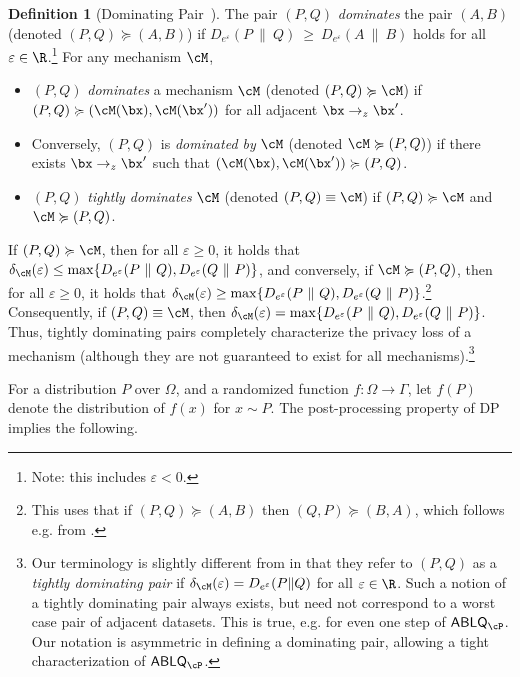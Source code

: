 \documentclass[twoside]{article}
\theoremstyle{definition}
\newtheorem{definition}[theorem]{Definition}
\newcommand{\eps}{\varepsilon}
\newcommand{\Deps}{D_{e^{\eps}}}
\newcommand{\ABLQ}{\mathsf{ABLQ}}
\newcommand{\ABLQP}{\ABLQ_{\cP}}
\newcommand{\dominates}{\succcurlyeq}%
\begin{document}
\begin{definition}[Dominating Pair~\citep{zhu22optimal}]\label{def:dominating-pair}
The pair $(P, Q)$ {\em dominates} the pair $(A, B)$ (denoted $(P, Q) \dominates (A, B)$) if $\Deps(P ~\|~ Q) ~\ge~ \Deps(A ~\|~ B)$ holds for all $\eps \in \R$.\footnote{Note: this includes $\eps < 0$.} For any mechanism $\cM$,
\begin{itemize}
\item $(P, Q)$ {\em dominates} a mechanism $\cM$ (denoted $(P, Q) \dominates \cM$) if $(P, Q) \dominates (\cM(\bx), \cM(\bx'))$ for all adjacent $\bx \to_z \bx'$.
\item Conversely, $(P, Q)$ is {\em dominated by} $\cM$ (denoted $\cM \dominates (P, Q)$) if there exists $\bx \to_z \bx'$ such that $(\cM(\bx), \cM(\bx')) \dominates (P, Q)$.
\item $(P, Q)$ {\em tightly dominates} $\cM$ (denoted $(P, Q) \equiv \cM$) if $(P, Q) \dominates \cM$ and $\cM \dominates (P, Q)$.
\end{itemize}
\end{definition}

If $(P, Q) \dominates \cM$, then for all $\eps \ge 0$, it holds that $\delta_{\cM}(\eps) \le \max \{ D_{e^\eps}(P ~\|~ Q), \Deps(Q ~\|~ P) \}$,
and conversely, if $\cM \dominates (P, Q)$, then for all $\eps \ge 0$, it holds that $\delta_{\cM}(\eps) \ge \max \{ D_{e^\eps}(P ~\|~ Q), \Deps(Q ~\|~ P) \}$.\footnote{This uses that if $(P, Q) \dominates (A, B)$ then $(Q, P) \dominates (B, A)$, which follows e.g. from \citet[Lemma 46]{zhu22optimal}.}
Consequently, if $(P, Q) \equiv \cM$, then $\delta_{\cM}(\eps) = \max\{ D_{e^\eps}(P ~\|~ Q), \Deps(Q ~\|~ P) \}$.
Thus, tightly dominating pairs completely characterize the privacy loss of a mechanism (although they are not guaranteed to exist for all mechanisms).\footnote{Our terminology is slightly different from \cite{zhu22optimal} in that they refer to $(P, Q)$ as a {\em tightly dominating pair} if $\delta_{\cM}(\eps) = D_{e^{\eps}}(P \| Q)$ for all $\eps \in \R$. Such a notion of a tightly dominating pair always exists, but need not correspond to a worst case pair of adjacent datasets. This is true, e.g. for even one step of $\ABLQP$. Our notation is asymmetric in defining a dominating pair, allowing a tight characterization of $\ABLQP$.}

For a distribution $P$ over $\Omega$, and a randomized function $f : \Omega \to \Gamma$, let $f(P)$ denote the distribution of $f(x)$ for $x \sim P$. The post-processing property of DP implies the following.
\end{document}
